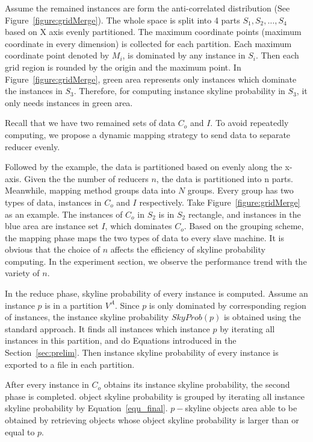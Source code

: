 Assume the remained instances are form the anti-correlated distribution (See Figure~\ref{figure:gridMerge}). The whole space is split into 4 parts $S_1, S_2, \dots, S_4$ based on X axis evenly partitioned. The maximum coordinate points (maximum coordinate in every dimension) is collected for each partition. Each maximum coordinate point denoted by $M_i$, is dominated by any instance in $S_i$. Then each grid region is rounded by the origin and the maximum point. In Figure~\ref{figure:gridMerge}, green area represents only instances which dominate the instances in $S_3$. Therefore, for computing instance skyline probability in $S_3$, it only needs instances in green area.

Recall that we have two remained sets of data $C_o$ and $I$. To avoid repeatedly computing, we propose a dynamic mapping strategy to send data to separate reducer evenly.



Followed by the example, the data is partitioned based on evenly along the x-axis. Given the the number of reducers $n$, the data is partitioned into n parts. Meanwhile, mapping method groups data into $N$ groups. Every group has two types of data, instances in $C_o$ and $I$ respectively. Take Figure~\ref{figure:gridMerge} as an example. The instances of $C_o$ in $S_2$ is in $S_2$ rectangle, and instances in the blue area are instance set $I$, which dominates $C_o$. Based on the grouping scheme, the mapping phase maps the two types of data to every slave machine. It is obvious that the choice of $n$ affects the efficiency of skyline probability computing. In the experiment section, we observe the performance trend with the variety of $n$.

In the reduce phase, skyline probability of every instance is computed. Assume an instance $p$ is in a partition $V^A$. Since $p$ is only dominated by corresponding region of instances, the instance skyline probability $SkyProb(p)$ is obtained using the standard approach. It finds all instances which instance $p$ by iterating all instances in this partition, and do Equations introduced in the Section~\ref{sec:prelim}. Then instance skyline probability of every instance is exported to a file in each partition.

After every instance in $C_o$ obtains its instance skyline probability, the second phase is completed. object skyline probability is grouped by iterating all instance skyline probability by Equation~\ref{equ_final}. $p-$skyline objects area able to be obtained by retrieving objects whose object skyline probability is larger than or equal to $p$.

